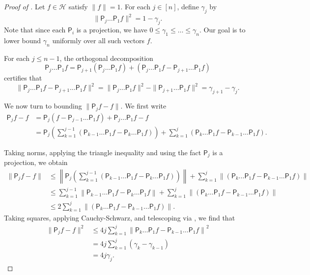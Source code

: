 \documentclass[11pt]{article}
\begin{document}
    \begin{proof}[Proof of ]
    Let $f\in \mathcal{H}$ satisfy $\|f\|=1$. For each $j\in [n]$, define $\gamma_j$ by
    \begin{equation*}
        \|\mathsf{P}_j\ldots \mathsf{P}_1 f\|^2=1-\gamma_j.
    \end{equation*}
    Note that since each $\mathsf{P}_i$ is a projection, we have $0\leq \gamma_1\leq\ldots\leq \gamma_n$. Our goal is to lower bound $\gamma_n$ uniformly over all such vectors $f$.

    For each $j\leq n-1$, the orthogonal decomposition
    \begin{equation*}
        \mathsf{P}_j\ldots \mathsf{P}_1f = \mathsf{P}_{j+1}( \mathsf{P}_j\ldots \mathsf{P}_1f)+(\mathsf{P}_j\ldots \mathsf{P}_1f-\mathsf{P}_{j+1}\ldots \mathsf{P}_1 f)
    \end{equation*}
    certifies that
    \begin{equation}
    \label{eq:telescope}
        \|\mathsf{P}_j\ldots \mathsf{P}_1f-\mathsf{P}_{j+1}\ldots \mathsf{P}_1 f\|^2=\|\mathsf{P}_j\ldots \mathsf{P}_1f\|^2-\|\mathsf{P}_{j+1}\ldots \mathsf{P}_1f\|^2=\gamma_{j+1}-\gamma_j.
    \end{equation}

    We now turn to bounding $\|\mathsf{P}_j f-f\|$. We first write
    \begin{align*}
        \mathsf{P}_j f-f &= \mathsf{P}_j(f-\mathsf{P}_{j-1}\ldots \mathsf{P}_1 f) + \mathsf{P}_j\ldots \mathsf{P}_1f -f\\
        &=\mathsf{P}_j\left(\sum_{k=1}^{j-1} (\mathsf{P}_{k-1}\ldots \mathsf{P}_1 f-\mathsf{P}_{k}\ldots \mathsf{P}_1 f)\right)+\sum_{k=1}^j (\mathsf{P}_{k}\ldots \mathsf{P}_1 f -  \mathsf{P}_{k-1}\ldots \mathsf{P}_1 f).
    \end{align*}

    Taking norms, applying the triangle inequality and using the fact $\mathsf{P}_j$ is a projection, we obtain
\begin{align*}
    \| \mathsf{P}_j f-f\|&\leq \left\| \mathsf{P}_j\left(\sum_{k=1}^{j-1} (\mathsf{P}_{k-1}\ldots \mathsf{P}_1 f-\mathsf{P}_{k}\ldots \mathsf{P}_1 f)\right)\right\|+\sum_{k=1}^j \left\|(\mathsf{P}_{k}\ldots \mathsf{P}_1 f -  \mathsf{P}_{k-1}\ldots \mathsf{P}_1 f)\right\|\\
    &\leq \sum_{k=1}^{j-1} \left\|\mathsf{P}_{k-1}\ldots \mathsf{P}_1 f-\mathsf{P}_{k}\ldots \mathsf{P}_1 f\right\|+\sum_{k=1}^j \left\|(\mathsf{P}_{k}\ldots \mathsf{P}_1 f -  \mathsf{P}_{k-1}\ldots \mathsf{P}_1 f)\right\|\\
    &\leq 2 \sum_{k=1}^j \left\|(\mathsf{P}_{k}\ldots \mathsf{P}_1 f -  \mathsf{P}_{k-1}\ldots \mathsf{P}_1 f)\right\|.
\end{align*}
Taking squares, applying Cauchy-Schwarz, and telescoping via , we find that
\begin{align*}
    \| \mathsf{P}_j f-f\|^2&\leq 4j\sum_{k=1}^j \left\|\mathsf{P}_{k}\ldots \mathsf{P}_1 f -  \mathsf{P}_{k-1}\ldots \mathsf{P}_1 f\right\|^2\\
    &=4j\sum_{k=1}^j (\gamma_{k}-\gamma_{k-1})\\
    &=4j\gamma_j.
\end{align*}


\end{proof}
\end{document}
